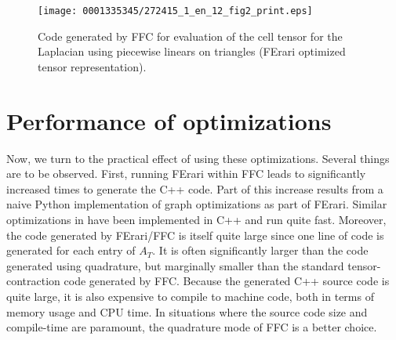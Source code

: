 \begin{figure}[!t]
\bwfig
\texttt{[image: 0001335345/272415\_1\_en\_12\_fig2\_print.eps]}
  \caption{Code generated by FFC for evaluation of the cell tensor for
    the Laplacian using piecewise linears on triangles (FErari
    optimized tensor representation).}
  \label{fig:code,poisson,optimized}\vspace*{6pt}
\end{figure}

\section{Performance of optimizations}

Now, we turn to the practical effect of using these optimizations.
Several things are to be observed. First, running FErari within FFC
leads to significantly increased times to generate the C++ code. Part
of this increase results from a naive Python implementation of graph
optimizations as part of FErari. Similar optimizations
in \citet{WolfHeath2009} have been implemented in C++ and run quite
fast. Moreover, the code generated by FErari/FFC is itself quite large
since one line of code is generated for each entry of $A_T$. It is
often significantly larger than the code generated using quadrature,
but marginally smaller than the standard tensor-contraction code
generated by FFC. Because the generated C++ source code is quite
large, it is also expensive to compile to machine code, both in terms
of memory usage and CPU time. In situations where the source code size
and compile-time are paramount, the quadrature mode of FFC is a better
choice.

